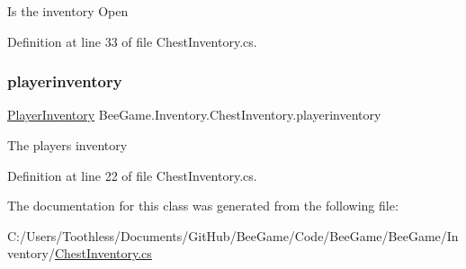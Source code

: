 Is the inventory Open 



Definition at line 33 of file Chest\+Inventory.\+cs.

\mbox{\label{class_bee_game_1_1_inventory_1_1_chest_inventory_a79ff450013724b84c1c21858c63404b0}} 
\subsubsection{\texorpdfstring{playerinventory}{playerinventory}}
{\footnotesize\ttfamily \hyperlink{class_bee_game_1_1_inventory_1_1_player_inventory}{Player\+Inventory} Bee\+Game.\+Inventory.\+Chest\+Inventory.\+playerinventory\hspace{0.3cm}{\ttfamily [private]}}



The players inventory 



Definition at line 22 of file Chest\+Inventory.\+cs.



The documentation for this class was generated from the following file\+:\begin{DoxyCompactItemize}
\item 
C\+:/\+Users/\+Toothless/\+Documents/\+Git\+Hub/\+Bee\+Game/\+Code/\+Bee\+Game/\+Bee\+Game/\+Inventory/\hyperlink{_chest_inventory_8cs}{Chest\+Inventory.\+cs}\end{DoxyCompactItemize}
